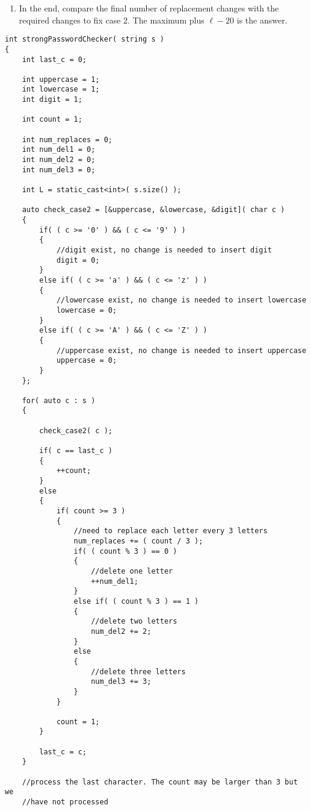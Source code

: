 \begin{enumerate}
\item In the end, compare the final number of replacement changes with the required changes to fix case 2. The maximum plus $\ell-20$ is the answer. 
\end{enumerate}

\setcounter{lstlisting}{0}
\begin{lstlisting}[style=customc, caption={Change to $3\times n+2$ sequence}]
int strongPasswordChecker( string s )
{
    int last_c = 0;

    int uppercase = 1;
    int lowercase = 1;
    int digit = 1;

    int count = 1;

    int num_replaces = 0;
    int num_del1 = 0;
    int num_del2 = 0;
    int num_del3 = 0;

    int L = static_cast<int>( s.size() );

    auto check_case2 = [&uppercase, &lowercase, &digit]( char c )
    {
        if( ( c >= '0' ) && ( c <= '9' ) )
        {
            //digit exist, no change is needed to insert digit
            digit = 0;
        }
        else if( ( c >= 'a' ) && ( c <= 'z' ) )
        {
            //lowercase exist, no change is needed to insert lowercase
            lowercase = 0;
        }
        else if( ( c >= 'A' ) && ( c <= 'Z' ) )
        {
            //uppercase exist, no change is needed to insert uppercase
            uppercase = 0;
        }
    };

    for( auto c : s )
    {

        check_case2( c );

        if( c == last_c )
        {
            ++count;
        }
        else
        {
            if( count >= 3 )
            {
                //need to replace each letter every 3 letters
                num_replaces += ( count / 3 );
                if( ( count % 3 ) == 0 )
                {
                    //delete one letter
                    ++num_del1;
                }
                else if( ( count % 3 ) == 1 )
                {
                    //delete two letters
                    num_del2 += 2;
                }
                else
                {
                    //delete three letters
                    num_del3 += 3;
                }
            }

            count = 1;
        }

        last_c = c;
    }

    //process the last character. The count may be larger than 3 but we
    //have not processed


\end{lstlisting}
